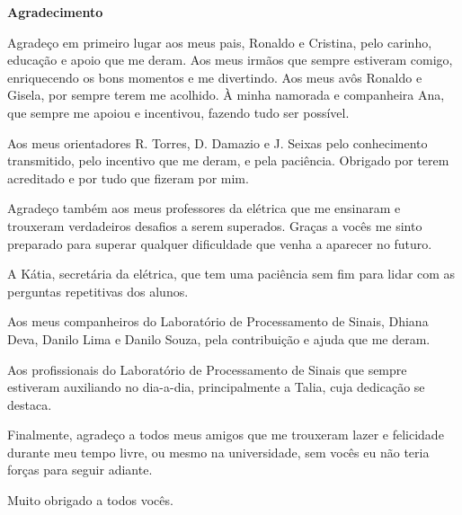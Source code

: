 \cleardoublepage

\begin{center}
\textbf{\Large Agradecimento}
\end{center}

Agradeço em primeiro lugar aos meus pais, Ronaldo e Cristina, 
pelo carinho, educação e apoio que me deram. Aos meus irmãos que sempre
estiveram comigo, enriquecendo os bons momentos e me divertindo. Aos meus 
avôs Ronaldo e Gisela, por sempre terem me acolhido. À minha namorada e 
companheira Ana, que sempre me apoiou e incentivou, fazendo tudo ser possível.

Aos meus orientadores R. Torres, D. Damazio e J. Seixas pelo conhecimento
transmitido, pelo incentivo que me deram, e pela paciência. Obrigado 
por terem acreditado e por tudo que fizeram por mim.

Agradeço também aos meus professores da elétrica que me ensinaram e trouxeram 
verdadeiros desafios a serem superados. Graças a vocês me sinto preparado para
superar qualquer dificuldade que venha a aparecer no futuro.

A Kátia, secretária da elétrica, que tem uma paciência sem fim para lidar com as
perguntas repetitivas dos alunos.

Aos meus companheiros do Laboratório de Processamento de Sinais, Dhiana Deva, Danilo Lima
e Danilo Souza, pela contribuição e ajuda que me deram.

Aos profissionais do Laboratório de Processamento de Sinais que sempre 
estiveram auxiliando no dia-a-dia, principalmente a Talia, cuja 
dedicação se destaca.

Finalmente, agradeço a todos meus amigos que me trouxeram 
lazer e felicidade durante meu tempo livre, ou mesmo na universidade, 
sem vocês eu não teria forças para seguir adiante.

Muito obrigado a todos vocês.
